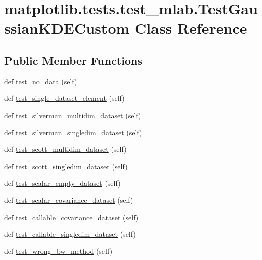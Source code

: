 \hypertarget{classmatplotlib_1_1tests_1_1test__mlab_1_1TestGaussianKDECustom}{}\section{matplotlib.\+tests.\+test\+\_\+mlab.\+Test\+Gaussian\+K\+D\+E\+Custom Class Reference}
\label{classmatplotlib_1_1tests_1_1test__mlab_1_1TestGaussianKDECustom}
\subsection*{Public Member Functions}
\begin{DoxyCompactItemize}
\item 
def \hyperlink{classmatplotlib_1_1tests_1_1test__mlab_1_1TestGaussianKDECustom_a0fff68a8acff6287d585d6d377ed0dc7}{test\+\_\+no\+\_\+data} (self)
\item 
def \hyperlink{classmatplotlib_1_1tests_1_1test__mlab_1_1TestGaussianKDECustom_a9627ccb268119fc3f97de941443f35b1}{test\+\_\+single\+\_\+dataset\+\_\+element} (self)
\item 
def \hyperlink{classmatplotlib_1_1tests_1_1test__mlab_1_1TestGaussianKDECustom_ad8517e4afa9c575dd701379d4a24fbc1}{test\+\_\+silverman\+\_\+multidim\+\_\+dataset} (self)
\item 
def \hyperlink{classmatplotlib_1_1tests_1_1test__mlab_1_1TestGaussianKDECustom_a99a2509ac69e77ed872a6473bf215ac3}{test\+\_\+silverman\+\_\+singledim\+\_\+dataset} (self)
\item 
def \hyperlink{classmatplotlib_1_1tests_1_1test__mlab_1_1TestGaussianKDECustom_ab965229bb6edeec86ef53887cb1a377a}{test\+\_\+scott\+\_\+multidim\+\_\+dataset} (self)
\item 
def \hyperlink{classmatplotlib_1_1tests_1_1test__mlab_1_1TestGaussianKDECustom_a7d0d9ff6cd1f40614572fa9f4374503a}{test\+\_\+scott\+\_\+singledim\+\_\+dataset} (self)
\item 
def \hyperlink{classmatplotlib_1_1tests_1_1test__mlab_1_1TestGaussianKDECustom_aeedf0f197244f2e84397b9089e08dbf6}{test\+\_\+scalar\+\_\+empty\+\_\+dataset} (self)
\item 
def \hyperlink{classmatplotlib_1_1tests_1_1test__mlab_1_1TestGaussianKDECustom_af4c78aac99dd10bdd564f1c8c687da22}{test\+\_\+scalar\+\_\+covariance\+\_\+dataset} (self)
\item 
def \hyperlink{classmatplotlib_1_1tests_1_1test__mlab_1_1TestGaussianKDECustom_acdea804802ce4b36d440d76cf0f53430}{test\+\_\+callable\+\_\+covariance\+\_\+dataset} (self)
\item 
def \hyperlink{classmatplotlib_1_1tests_1_1test__mlab_1_1TestGaussianKDECustom_ac2a210c6af3dabe50d3bdec0363d080c}{test\+\_\+callable\+\_\+singledim\+\_\+dataset} (self)
\item 
def \hyperlink{classmatplotlib_1_1tests_1_1test__mlab_1_1TestGaussianKDECustom_a5eecbf05e2e5792229d90ff9e31a8033}{test\+\_\+wrong\+\_\+bw\+\_\+method} (self)
\end{DoxyCompactItemize}


